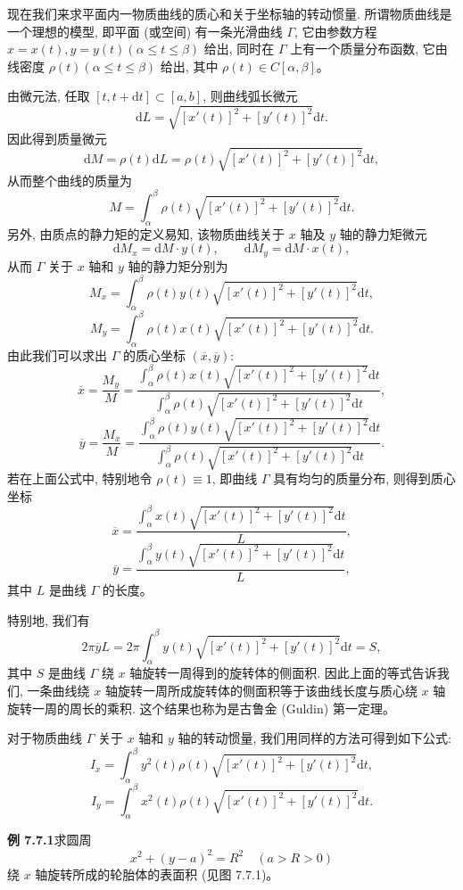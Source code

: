 \documentclass[UTF8,12pt,a4paper,fontset=fandol]{ctexart}
\begin{document}
现在我们来求平面内一物质曲线的质心和关于坐标轴的转动惯量. 所谓物质曲线是一个理想的模型, 即平面 (或空间) 有一条光滑曲线 $\Gamma$, 它由参数方程 $x=x(t),y=y(t)(\alpha\leq t\leq\beta)$ 给出, 同时在 $\Gamma$ 上有一个质量分布函数, 它由线密度 $\rho(t)(\alpha\leq t\leq\beta)$ 给出, 其中 $\rho(t)\in C[\alpha,\beta]$。

由微元法, 任取 $[t,t+\mathrm dt]\subset[a,b]$, 则曲线弧长微元
\[
  \mathrm dL=\sqrt{[x'(t)]^2+[y'(t)]^2}\mathrm dt.
\]
因此得到质量微元
\[
  \mathrm dM=\rho(t)\mathrm dL=\rho(t)\sqrt{[x'(t)]^2+[y'(t)]^2}\mathrm dt,
\]
从而整个曲线的质量为
\[
  M=\int_\alpha^\beta \rho(t)\sqrt{[x'(t)]^2+[y'(t)]^2}\mathrm dt.
\]
另外, 由质点的静力矩的定义易知, 该物质曲线关于 $x$ 轴及 $y$ 轴的静力矩微元
\[
  \mathrm dM_x=\mathrm dM\cdot y(t),\qquad
  \mathrm dM_y=\mathrm dM\cdot x(t),
\]
从而 $\Gamma$ 关于 $x$ 轴和 $y$ 轴的静力矩分别为
\[
  M_x=\int_\alpha^\beta \rho(t)y(t)\sqrt{[x'(t)]^2+[y'(t)]^2}\mathrm dt,
\]
\[
  M_y=\int_\alpha^\beta \rho(t)x(t)\sqrt{[x'(t)]^2+[y'(t)]^2}\mathrm dt.
\]
由此我们可以求出 $\Gamma$ 的质心坐标 $(\overline x,\overline y)$:
\[
  \overline x=\frac{M_y}{M}
  =\frac{\int_\alpha^\beta \rho(t)x(t)\sqrt{[x'(t)]^2+[y'(t)]^2}\mathrm dt}
  {\int_\alpha^\beta \rho(t)\sqrt{[x'(t)]^2+[y'(t)]^2}\mathrm dt},
\]
\[
  \overline y=\frac{M_x}{M}
  =\frac{\int_\alpha^\beta \rho(t)y(t)\sqrt{[x'(t)]^2+[y'(t)]^2}\mathrm dt}
  {\int_\alpha^\beta \rho(t)\sqrt{[x'(t)]^2+[y'(t)]^2}\mathrm dt}.
\]
若在上面公式中, 特别地令 $\rho(t)\equiv1$, 即曲线 $\Gamma$ 具有均匀的质量分布, 则得到质心坐标
\[
  \overline x=\frac{\int_\alpha^\beta x(t)\sqrt{[x'(t)]^2+[y'(t)]^2}\mathrm dt}{L},
\]
\[
  \overline y=\frac{\int_\alpha^\beta y(t)\sqrt{[x'(t)]^2+[y'(t)]^2}\mathrm dt}{L},
\]
其中 $L$ 是曲线 $\Gamma$ 的长度。

特别地, 我们有
\[
  2\pi\overline yL
  =2\pi\int_\alpha^\beta y(t)\sqrt{[x'(t)]^2+[y'(t)]^2}\mathrm dt=S,
\]
其中 $S$ 是曲线 $\Gamma$ 绕 $x$ 轴旋转一周得到的旋转体的侧面积. 因此上面的等式告诉我们, 一条曲线绕 $x$ 轴旋转一周所成旋转体的侧面积等于该曲线长度与质心绕 $x$ 轴旋转一周的周长的乘积. 这个结果也称为是古鲁金 (Guldin) 第一定理。

对于物质曲线 $\Gamma$ 关于 $x$ 轴和 $y$ 轴的转动惯量, 我们用同样的方法可得到如下公式:
\[
  I_x=\int_\alpha^\beta y^2(t)\rho(t)\sqrt{[x'(t)]^2+[y'(t)]^2}\mathrm dt,
\]
\[
  I_y=\int_\alpha^\beta x^2(t)\rho(t)\sqrt{[x'(t)]^2+[y'(t)]^2}\mathrm dt.
\]

\noindent\textbf{例 7.7.1}\quad 求圆周
\[
  x^2+(y-a)^2=R^2\quad(a>R>0)
\]
绕 $x$ 轴旋转所成的轮胎体的表面积 (见图 7.7.1)。
\end{document}
